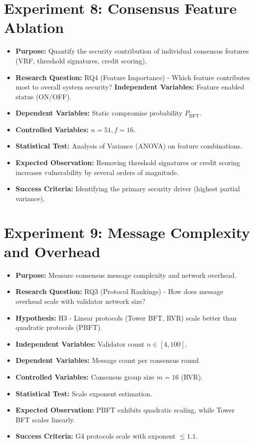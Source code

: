 \documentclass[12pt, oneside, a4paper]{report}
\theoremstyle{definition}
\theoremstyle{remark}
\begin{document}
\section{Experiment 8: Consensus Feature Ablation}
\label{sec:ed:e8}
\begin{itemize}
  \item \textbf{Purpose:} Quantify the security contribution of individual consensus features (VRF, threshold signatures, credit scoring).
  \item \textbf{Research Question:} RQ4 (Feature Importance) - Which feature contributes most to overall system security?
  \textbf{Independent Variables:} Feature enabled status (ON/OFF).
  \item \textbf{Dependent Variables:} Static compromise probability $P_{\mathrm{BFT}}$.
  \item \textbf{Controlled Variables:} $n=51, f=16$.
  \item \textbf{Statistical Test:} Analysis of Variance (ANOVA) on feature combinations.
  \item \textbf{Expected Observation:} Removing threshold signatures or credit scoring increases vulnerability by several orders of magnitude.
  \item \textbf{Success Criteria:} Identifying the primary security driver (highest partial variance).
\end{itemize}

\section{Experiment 9: Message Complexity and Overhead}
\label{sec:ed:e9}
\begin{itemize}
  \item \textbf{Purpose:} Measure consensus message complexity and network overhead.
  \item \textbf{Research Question:} RQ3 (Protocol Rankings) - How does message overhead scale with validator network size?
  \item \textbf{Hypothesis:} H3 - Linear protocols (Tower BFT, RVR) scale better than quadratic protocols (PBFT).
  \item \textbf{Independent Variables:} Validator count $n \in [4, 100]$.
  \item \textbf{Dependent Variables:} Message count per consensus round.
  \item \textbf{Controlled Variables:} Consensus group size $m = 16$ (RVR).
  \item \textbf{Statistical Test:} Scale exponent estimation.
  \item \textbf{Expected Observation:} PBFT exhibits quadratic scaling, while Tower BFT scales linearly.
  \item \textbf{Success Criteria:} G4 protocols scale with exponent $\le 1.1$.
\end{itemize}
\end{document}
